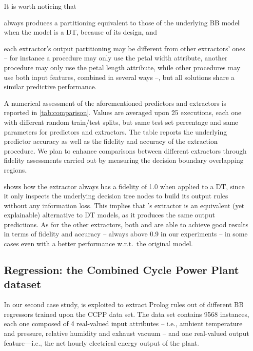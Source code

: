 \documentclass[12pt,a4paper,openright,twoside]{book}
\begin{document}
It is worth noticing that
%
\begin{inlinelist}
    \item \cart{} always produces a partitioning equivalent to those of the underlying BB model when the model is a DT, because of its design, and
    \item each extractor's output partitioning may be different from other extractors' ones -- for instance a procedure may only use the petal width attribute, another procedure may only use the petal length attribute, while other procedures may use both input features, combined in several ways --, but all solutions share a similar predictive performance.
\end{inlinelist}

A numerical assessment of the aforementioned predictors and extractors is reported in \cref{tab:comparison}.
%
Values are averaged upon 25 executions, each one with different random train/test splits, but same test set percentage and same parameters for predictors and extractors.
%
The table reports the underlying predictor accuracy as well as the fidelity and accuracy of the extraction procedure.
%
We plan to enhance comparisons between different extractors through fidelity assessments carried out by measuring the decision boundary overlapping regions.

 shows how the \cart{} extractor always has a fidelity of 1.0 when applied to a DT, since it only inspects the underlying decision tree nodes to build its output rules without any information loss.
%
This implies that \psyke{}'s \cart{} extractor is an equivalent (yet explainable) alternative to DT models, as it produces the same output predictions.
%
As for the other extractors, both \real{} and \trepan{} are able to achieve good results in terms of fidelity and accuracy -- always above 0.9 in our experiments -- in some cases even with a better performance w.r.t.\ the original model.

\subsection[Regression: the CCPP dataset]{Regression: the Combined Cycle Power Plant dataset}

In our second case study, \psyke{} is exploited to extract Prolog rules out of different BB regressors trained upon the CCPP data set.
%
The data set contains 9568 instances, each one composed of 4 real-valued input attributes -- i.e., ambient temperature and pressure, relative humidity and exhaust vacuum -- and one real-valued output feature---i.e., the net hourly electrical energy output of the plant.
\end{document}

